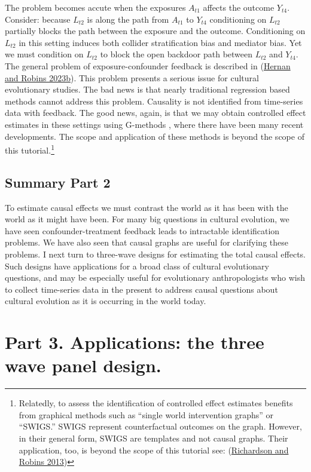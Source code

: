 \documentclass[
  singlecolumn]{report}
\begin{document}
The problem becomes accute when the exposures \(A_{t1}\) affects the
outcome \(Y_{t4}\). Consider: because \(L_{t2}\) is along the path from
\(A_{t1}\) to \(Y_{t4}\) conditioning on \(L_{t2}\) partially blocks the
path between the exposure and the outcome. Conditioning on \(L_{t2}\) in
this setting induces both collider stratification bias and mediator
bias. Yet we must condition on \(L_{t2}\) to block the open backdoor
path between \(L_{t2}\) and \(Y_{t4}\). The general problem of
exposure-confounder feedback is described in
(\protect\hyperlink{ref-hernan2023b}{Hernan and Robins 2023b}). This
problem presents a serious issue for cultural evolutionary studies. The
bad news is that nearly traditional regression based methods cannot
address this problem. Causality is not identified from time-series data
with feedback. The good news, again, is that we may obtain controlled
effect estimates in these settings using G-methods , where there have
been many recent developments. The scope and application of these
methods is beyond the scope of this tutorial.\footnote{Relatedly, to
  assess the identification of controlled effect estimates benefits from
  graphical methods such as ``single world intervention graphs'' or
  ``SWIGS.'' SWIGS represent counterfactual outcomes on the graph.
  However, in their general form, SWIGS are templates and not causal
  graphs. Their application, too, is beyond the scope of this tutorial
  see: (\protect\hyperlink{ref-richardson2013}{Richardson and Robins
  2013})}

\hypertarget{summary-part-2}{%
\subsection{Summary Part 2}\label{summary-part-2}}

To estimate causal effects we must contrast the world as it has been
with the world as it might have been. For many big questions in cultural
evolution, we have seen confounder-treatment feedback leads to
intractable identification problems. We have also seen that causal
graphs are useful for clarifying these problems. I next turn to
three-wave designs for estimating the total causal effects. Such designs
have applications for a broad class of cultural evolutionary questions,
and may be especially useful for evolutionary anthropologists who wish
to collect time-series data in the present to address causal questions
about cultural evolution as it is occurring in the world today.

\hypertarget{part-3.-applications-the-three-wave-panel-design.}{%
\section{Part 3. Applications: the three wave panel
design.}\label{part-3.-applications-the-three-wave-panel-design.}}
\end{document}

